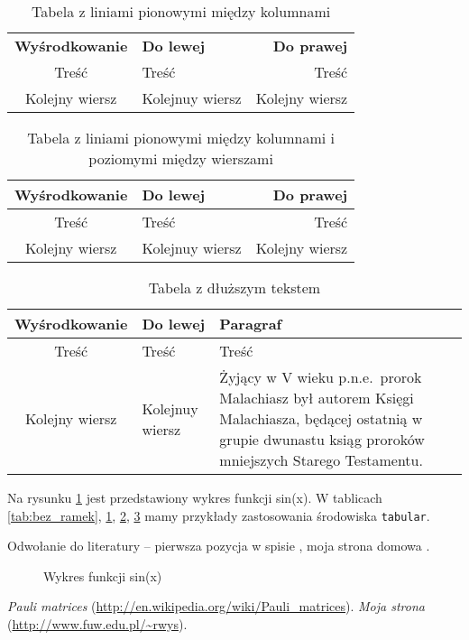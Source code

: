 \documentclass[12pt,a4paper]{article}
\begin{document}
\begin{table}[htb]
  \begin{tabular}{c|l|r}
  {\bf Wyśrodkowanie} & {\bf Do lewej} & {\bf Do prawej} \\
  Treść & Treść & Treść \\
  Kolejny wiersz & Kolejnuy wiersz & Kolejny wiersz \\
  \end{tabular}
\caption{Tabela z liniami pionowymi między kolumnami}
\label{tab:pionowe}
\end{table}

\begin{table}[htb]
  \begin{tabular}{|c|l|r|}
  \hline
  {\bf Wyśrodkowanie} & {\bf Do lewej} & {\bf Do prawej} \\
  \hline
  \hline
  Treść & Treść & Treść \\
  \hline
  Kolejny wiersz & Kolejnuy wiersz & Kolejny wiersz \\
  \hline
  \end{tabular}
\caption{Tabela z liniami pionowymi między kolumnami i poziomymi między wierszami}
\label{tab:ramki}
\end{table}

\begin{table}[htb]
  \begin{tabular}{|c|l|p{6cm}|}
  \hline
  {\bf Wyśrodkowanie} & {\bf Do lewej} & {\bf Paragraf} \\
  \hline
  \hline
  Treść & Treść & Treść \\
  \hline
  Kolejny wiersz & Kolejnuy wiersz &
  Żyjący w V wieku p.n.e.~prorok Malachiasz był autorem Księgi Malachiasza, będącej
  ostatnią w grupie dwunastu ksiąg proroków mniejszych Starego Testamentu. \\
  \hline
  \end{tabular}
\caption{Tabela z dłuższym tekstem}
\label{tab:paragraf}
\end{table}

Na rysunku \ref{sinus} jest przedstawiony wykres funkcji sin(x).  W tablicach
\ref{tab:bez_ramek}, \ref{tab:pionowe}, \ref{tab:ramki}, \ref{tab:paragraf}
mamy przykłady zastosowania środowiska \verb#tabular#.

Odwołanie do literatury -- pierwsza pozycja w spisie \cite{Wikipedia}, moja strona
domowa \cite{RJW}.

\begin{figure}[htb!p]
\caption{Wykres funkcji sin(x)}
\label{sinus}
\end{figure}

\begin{thebibliography}{9}
 {\it Pauli matrices}
  (\url{http://en.wikipedia.org/wiki/Pauli_matrices}).
 {\it Moja strona} (\url{http://www.fuw.edu.pl/~rwys}).
\end{thebibliography}
\end{document}
